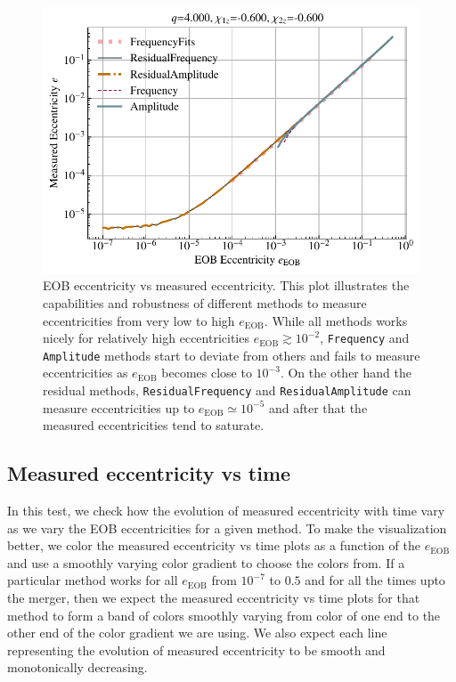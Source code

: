 \documentclass[aps,prd,amsmath,floats,floatfix, twocolumn,
superscriptaddress,nofootinbib,showpacs]{revtex4-1}
\begin{document}
\begin{figure}[thb]
\includegraphics[width=\columnwidth]{test_eob_vs_measured_ecc_example}
\caption{EOB eccentricity vs measured eccentricity. This plot illustrates the capabilities and robustness of different methods to measure eccentricities from very low to high $e_{\text{EOB}}$.
  While all methods works nicely for relatively high eccentricities $e_{\text{EOB}} \gtrsim 10^{-2}$, \texttt{Frequency} and \texttt{Amplitude} methods start to deviate from others
  and fails to measure eccentricities as $e_{\text{EOB}}$ becomes close to $10^{-3}$. On the other hand the residual methods, \texttt{ResidualFrequency} and \texttt{ResidualAmplitude}
can measure eccentricities up to $e_{\text{EOB}} \simeq 10^{-5}$ and after that the measured eccentricities tend to saturate.}
\label{fig:eob_vs_measured_ecc}
\end{figure}

\subsection{Measured eccentricity vs time}
\label{sec:measured-eccentricity-vs-time}
In this test, we check how the evolution of measured eccentricity with time vary as we vary the EOB eccentricities for a given method. To make the visualization better,
we color the measured eccentricity vs time plots as a function of the $e_{\text{EOB}}$ and use a smoothly varying color gradient to choose the colors from. If a particular method
works for all $e_{\text{EOB}}$ from $10^{-7}$ to $0.5$ and for all the times upto the merger, then we expect the measured eccentricity vs time plots for that method to form a band of colors
smoothly varying from color of one end to the other end of the color gradient we are using. We also expect each line representing the evolution of measured eccentricity to be smooth and monotonically
decreasing.
\end{document}
